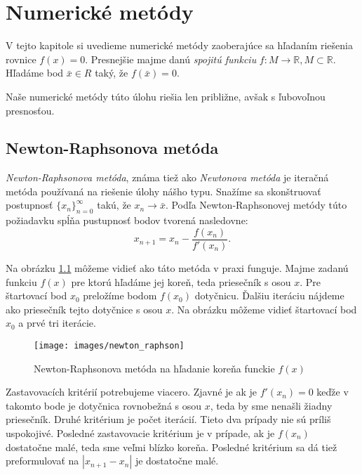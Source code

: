 
\chapter{Numerické metódy}

V tejto kapitole si uvedieme numerické metódy zaoberajúce sa hľadaním riešenia rovnice $f(x) = 0$.
Presnejšie majme danú \textit{spojitú funkciu} $f: M \to \mathbb{R}, M \subset \mathbb{R}$. Hľadáme bod
$\bar{x} \in R$ taký, že $f(\bar{x}) = 0$.

Naše numerické metódy túto úlohu riešia len približne, avšak s ľubovoľnou presnosťou.

\section{Newton-Raphsonova metóda}

\textit{Newton-Raphsonova metóda}, známa tiež ako \textit{Newtonova metóda} je iteračná metóda používaná na riešenie
úlohy nášho typu. Snažíme sa skonštruovať postupnosť $\{x_n\}_{n=0}^\infty$ takú, že $x_n \to \bar{x}$.
Podľa Newton-Raphsonovej metódy túto požiadavku spĺňa pustupnosť bodov tvorená nasledovne: 
$$ x_{n+1} = x_n - \frac{f(x_n)}{f'(x_n)}.$$

Na obrázku \ref{obr:newton_raphson} môžeme vidieť ako táto metóda v praxi funguje. Majme zadanú funkciu
$f(x)$ pre ktorú hľadáme jej koreň, teda priesečník s osou $x$. Pre štartovací bod
$x_0$ preložíme bodom $f(x_0)$ dotyčnicu. Ďalšiu iteráciu nájdeme ako priesečník tejto 
dotyčnice s osou $x$. Na obrázku môžeme vidieť štartovací bod $x_0$ a prvé tri iterácie.

\begin{figure}
    \centerline{\texttt{[image: images/newton\_raphson]}}
    \caption[Newton-Raphsonova metóda na hľadanie koreňa funckie $f(x)$]{Newton-Raphsonova metóda na hľadanie koreňa funckie $f(x)$}
    \label{obr:newton_raphson}
\end{figure}

Zastavovacích kritérií potrebujeme viacero. Zjavné je ak je $f'(x_n) = 0$ keďže v takomto bode je dotyčnica rovnobežná
s osou $x$, teda by sme nenašli žiadny priesečník. Druhé kritérium je počet iterácií. Tieto 
dva prípady nie sú príliš uspokojivé. Posledné zastavovacie kritérium je v prípade, ak je $f(x_n)$ dostatočne 
malé, teda sme veľmi blízko koreňa. Posledné kritérium sa dá tiež preformulovať na $|x_{n+1} - x_n|$ 
je dostatočne malé.

